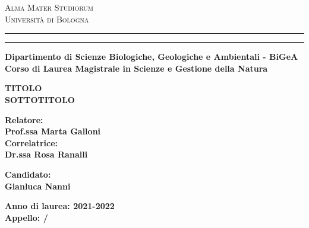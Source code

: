 \documentclass[a4paper,12pt]{article}
\begin{document}
\begin{titlepage}
\begin{center}
{{\Large{\textsc{Alma Mater Studiorum
\\
\medskip
Universit\`a di Bologna}}}} 
\rule[0.1cm]{14cm}{0.1mm}
\rule[0.5cm]{14cm}{0.6mm}
{\small{\bf Dipartimento di Scienze Biologiche, Geologiche e Ambientali - BiGeA\\
Corso di Laurea Magistrale in Scienze e Gestione della Natura}}
\end{center}
\vspace{30mm}
\begin{center}
{\LARGE{\bf TITOLO}}\\
\vspace{3mm}
{\LARGE{\bf SOTTOTITOLO}}\\
\end{center}
\vspace{40mm}
\par
\noindent
\begin{minipage}[t]{0.47\textwidth}
{\normalsize{\bf Relatore:\\
Prof.ssa Marta Galloni}}\vspace{0.5cm}\\
{\normalsize{\bf Correlatrice:\\
Dr.ssa Rosa Ranalli}}
\end{minipage}
\hfill
\begin{minipage}[t]{0.47\textwidth}\raggedleft
{\normalsize{\bf Candidato:\\
Gianluca Nanni}}
\end{minipage}
\vspace{30mm}
\begin{center}
{\normalsize{\bf Anno di laurea: 2021-2022\\
Appello: / }}%
\end{center}
\end{titlepage}

\clearpage
\null
\thispagestyle{empty}
\clearpage

\tableofcontents
\clearpage
\end{document}
